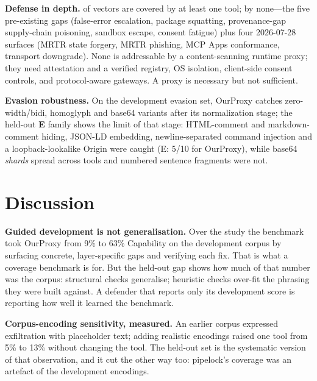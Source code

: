 \documentclass[conference]{IEEEtran}
\newcommand{\proxy}{OurProxy}
\newcommand{\rev}{2026-07-28}
\begin{document}
\begin{table}[t]
\caption{False positives on the benign-only corpus by input kind.}
\label{tab:benign}
\centering\scriptsize
\resizebox{\columnwidth}{!}{}
\end{table}

\textbf{Defense in depth.} \nCoveredAny{} of \nVectors{} vectors are covered by at least one tool; \nCoveredNone{} by none---the five pre-existing gaps (false-error escalation, package squatting, provenance-gap supply-chain poisoning, sandbox escape, consent fatigue) plus four \rev{} surfaces (MRTR state forgery, MRTR phishing, MCP Apps conformance, transport downgrade). None is addressable by a content-scanning runtime proxy; they need attestation and a verified registry, OS isolation, client-side consent controls, and protocol-aware gateways. A proxy is necessary but not sufficient.

\textbf{Evasion robustness.} On the development evasion set, \proxy{} catches zero-width/bidi, homoglyph and base64 variants after its normalization stage; the held-out \textbf{E} family shows the limit of that stage: HTML-comment and markdown-comment hiding, JSON-LD embedding, newline-separated command injection and a loopback-lookalike Origin were caught (E: 5/10 for \proxy), while base64 \emph{shards} spread across tools and numbered sentence fragments were not.

\section{Discussion}\label{sec:discussion}
\textbf{Guided development is not generalisation.} Over the study the benchmark took \proxy{} from 9\% to 63\% Capability on the development corpus by surfacing concrete, layer-specific gaps and verifying each fix. That is what a coverage benchmark is for. But the held-out gap shows how much of that number was the corpus: structural checks generalise; heuristic checks over-fit the phrasing they were built against. A defender that reports only its development score is reporting how well it learned the benchmark.

\textbf{Corpus-encoding sensitivity, measured.} An earlier corpus expressed exfiltration with placeholder text; adding realistic encodings raised one tool from 5\% to 13\% without changing the tool. The held-out set is the systematic version of that observation, and it cut the other way too: pipelock's coverage was an artefact of the development encodings.
\end{document}
